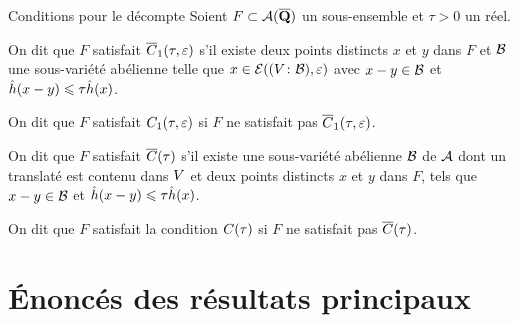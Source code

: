 \documentclass{mpg-thslides}
\begin{document}
\begin{frame}{Conditions pour le décompte}
  Soient \( F \subset \mathcal A(\overline{{\mathbf{Q}}}) \) un sous-ensemble et \( \tau > 0 \) un
  réel.
  \begin{tdef}
    On dit que \( F \) satisfait \( \condi*\tau\eps \) s'il existe deux points
    distincts \( x \) et \( y \) dans \( F \) et \( \mathcal B \) une sous-variété
    abélienne telle que \( x \in \mathcal E((V\colon\mathcal B), \varepsilon) \) avec \( x - y
      \in \mathcal B \) et \( \hat h ( x-y ) \leqslant \tau \hat h (x) \).

    On dit que \( F \) satisfait \( \condi\tau\eps \) si \( F \)
    ne satisfait pas \( \condi*\tau\eps \).
  \end{tdef}

  \begin{tdef}
    On dit que \( F \) satisfait \( \cond*\tau \) s'il existe une
    sous-variété abélienne \( \mathcal B \) de \( \mathcal A \) dont un translaté est contenu
    dans \( V \) et deux points distincts \( x \) et \( y \) dans \( F \),
    tels que \( x - y \in \mathcal B \) et \( \hat h ( x-y ) \leqslant \tau \hat h (x) \).

    On dit que \( F \) satisfait la condition \( \cond\tau \) si \( F \) ne
    satisfait pas \( \cond*\tau \).
  \end{tdef}
\end{frame}



\section[Résultats]{Énoncés des résultats principaux}
\tocsect
\end{document}
